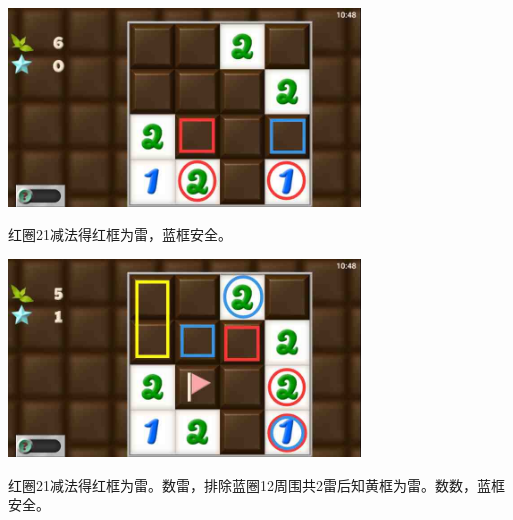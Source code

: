\subsection{} %
\begin{center}
    \includegraphics[width=0.7\textwidth]{puzzlelow/121-1.jpg}
\end{center}
红圈21减法得红框为雷，蓝框安全。
\begin{center}
    \includegraphics[width=0.7\textwidth]{puzzlelow/121-2.jpg}
\end{center}
红圈21减法得红框为雷。数雷，排除蓝圈12周围共2雷后知黄框为雷。数数，蓝框安全。

